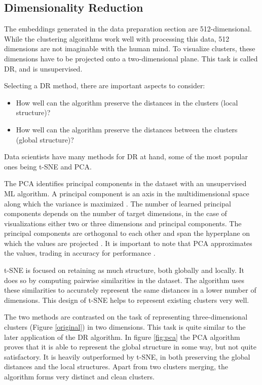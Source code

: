 \subsection{Dimensionality Reduction}

The embeddings generated in the data preparation section are 512-dimensional. While the clustering algorithms work well with processing this data, 512 dimensions are not imaginable with the human mind. To visualize clusters, these dimensions have to be projected onto a two-dimensional plane. This task is called \ac{DR}, and is unsupervised. 

Selecting a \ac{DR} method, there are important aspects to consider:
\begin{itemize}
	\item How well can the algorithm preserve the distances in the clusters (local structure)?
	\item How well can the algorithm preserve the distances between the clusters (global structure)?
\end{itemize}

Data scientists have many methods for \ac{DR} at hand, some of the most popular ones being \ac{t-SNE} and \ac{PCA}.

The \ac{PCA} identifies principal components in the dataset with an unsupervised \ac{ML} algorithm.\cite{40algorithms} A principal component is an axis in the multidimensional space along which the variance is maximized \cite{pcaVStsne}. The number of learned principal components depends on the number of target dimensions, in the case of visualizations either two or three dimensions and principal components. The principal components are orthogonal to each other and span the hyperplane on which the values are projected \cite{pcaVStsne}.
It is important to note that \ac{PCA} approximates the values, trading in accuracy for performance \cite{40algorithms}.

\ac{t-SNE} is focused on retaining as much structure, both globally and locally. It does so by computing pairwise similarities in the dataset. The algorithm uses these similarities to accurately represent the same distances in a lower number of dimensions. This design of \ac{t-SNE} helps to represent existing clusters very well.

The two methods are contrasted on the task of representing three-dimensional clusters (Figure \ref{original}) in two dimensions. This task is quite similar to the later application of the \ac{DR} algorithm. In figure \ref{fig:pca} the \ac{PCA} algorithm proves that it is able to represent the global structure in some way, but not quite satisfactory. It is heavily outperformed by \ac{t-SNE}, in both preserving the global distances and the local structures. Apart from two clusters merging, the algorithm forms very distinct and clean clusters.

